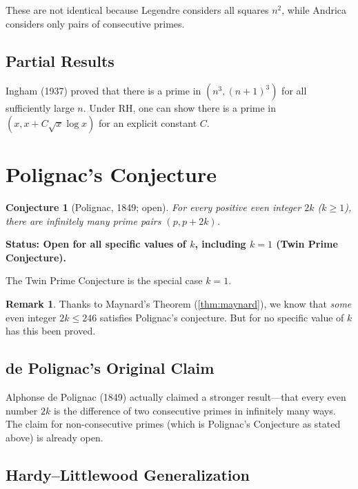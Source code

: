 \documentclass[12pt,a4paper]{amsart}
\newtheorem{conjecture}[theorem]{Conjecture}
\theoremstyle{definition}
\newtheorem{remark}[theorem]{Remark}
\begin{document}
These are not identical because Legendre considers all squares $n^2$, while
Andrica considers only pairs of consecutive primes.

\subsection{Partial Results}

Ingham (1937) proved that there is a prime in $(n^3, (n+1)^3)$ for all
sufficiently large $n$. Under RH, one can show there is a prime in
$(x, x + C\sqrt{x}\log x)$ for an explicit constant $C$.

\section{Polignac's Conjecture}

\begin{conjecture}[Polignac, 1849; open]
\label{conj:polignac}
For every positive even integer $2k$ ($k \geq 1$), there are infinitely many
prime pairs $(p, p + 2k)$.
\end{conjecture}

\textbf{Status: Open for all specific values of $k$, including $k=1$ (Twin Prime
Conjecture).}

The Twin Prime Conjecture is the special case $k=1$.

\begin{remark}
Thanks to Maynard's Theorem (\ref{thm:maynard}), we know that \emph{some}
even integer $2k \leq 246$ satisfies Polignac's conjecture. But for no specific
value of $k$ has this been proved.
\end{remark}

\subsection{de Polignac's Original Claim}

Alphonse de Polignac (1849) actually claimed a stronger result---that every even
number $2k$ is the difference of two consecutive primes in infinitely many
ways. The claim for non-consecutive primes (which is Polignac's Conjecture as
stated above) is already open.

\subsection{Hardy--Littlewood Generalization}
\end{document}
